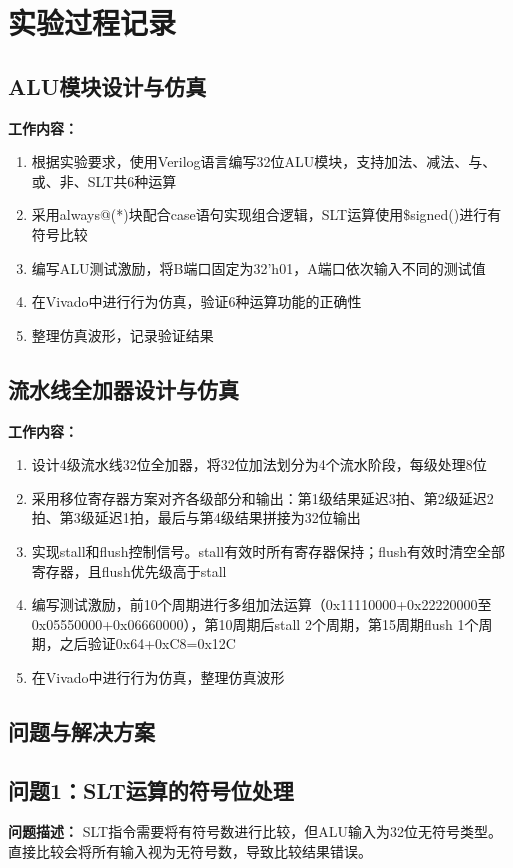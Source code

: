 \section{实验过程记录}

\subsection{ALU模块设计与仿真}

\textbf{工作内容：}
\begin{enumerate}
    \item 根据实验要求，使用Verilog语言编写32位ALU模块，支持加法、减法、与、或、非、SLT共6种运算
    \item 采用always@(*)块配合case语句实现组合逻辑，SLT运算使用\$signed()进行有符号比较
    \item 编写ALU测试激励，将B端口固定为32'h01，A端口依次输入不同的测试值
    \item 在Vivado中进行行为仿真，验证6种运算功能的正确性
    \item 整理仿真波形，记录验证结果
\end{enumerate}

\subsection{流水线全加器设计与仿真}

\textbf{工作内容：}
\begin{enumerate}
    \item 设计4级流水线32位全加器，将32位加法划分为4个流水阶段，每级处理8位
    \item 采用移位寄存器方案对齐各级部分和输出：第1级结果延迟3拍、第2级延迟2拍、第3级延迟1拍，最后与第4级结果拼接为32位输出
    \item 实现stall和flush控制信号。stall有效时所有寄存器保持；flush有效时清空全部寄存器，且flush优先级高于stall
    \item 编写测试激励，前10个周期进行多组加法运算（0x11110000+0x22220000至0x05550000+0x06660000），第10周期后stall 2个周期，第15周期flush 1个周期，之后验证0x64+0xC8=0x12C
    \item 在Vivado中进行行为仿真，整理仿真波形
\end{enumerate}

\subsection{问题与解决方案}

\subsection{问题1：SLT运算的符号位处理}
\textbf{问题描述：}
SLT指令需要将有符号数进行比较，但ALU输入为32位无符号类型。直接比较会将所有输入视为无符号数，导致比较结果错误。

